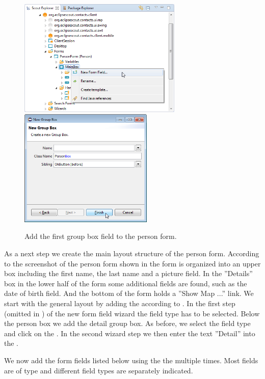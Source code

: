 \documentclass[a4paper,10pt,twoside]{book}
\begin{document}
\begin{figure}
\includegraphics[height=5.6cm]{new_field_personbox.png} \hspace{5mm}
\includegraphics[height=5.6cm]{new_field_personbox_name.png}
\caption{Add the first group box field to the person form.}
\end{figure}

As a next step we create the main layout structure of the person form. 
According to the screenshot of the person form shown in  the form is organized into an upper box including the first name, the last name and a picture field. 
In the ''Details'' box in the lower half of the form some additional fields are found, such as the date of birth field. 
And the bottom of the form holds a ''Show Map ...'' link.
We start with the general layout by adding the  according to . 
In the first step (omitted in ) of the new form field wizard the field type  has to be selected. 
Below the person box we add the detail group box. 
As before, we select the   field type and click on the . 
In the second wizard step we then enter the text ''Detail'' into the . 

We now add the form fields listed below using the the  multiple times. 
Most fields are of type  and different field types are separately indicated. 
\end{document}
